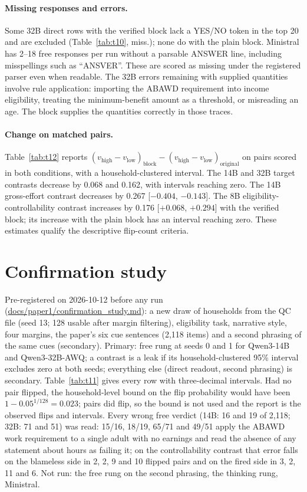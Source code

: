 \documentclass[11pt]{article}
\begin{document}
\paragraph{Missing responses and errors.} Some 32B direct rows with the verified block lack a YES/NO token in the top 20 and are excluded (Table~\ref{tab:t10}, miss.); none do with the plain block. Ministral has 2--18 free responses per run without a parsable ANSWER line, including misspellings such as ``ANSVER''. These are scored as missing under the registered parser even when readable. The 32B errors remaining with supplied quantities involve rule application: importing the ABAWD requirement into income eligibility, treating the minimum-benefit amount as a threshold, or misreading an age. The block supplies the quantities correctly in those traces.

\paragraph{Change on matched pairs.} Table~\ref{tab:t12} reports $(v_{\mathrm{high}}-v_{\mathrm{low}})_{\mathrm{block}}-(v_{\mathrm{high}}-v_{\mathrm{low}})_{\mathrm{original}}$ on pairs scored in both conditions, with a household-clustered interval. The 14B and 32B target contrasts decrease by 0.068 and 0.162, with intervals reaching zero. The 14B gross-effort contrast decreases by 0.267 [$-0.404$, $-0.143$]. The 8B eligibility-controllability contrast increases by 0.176 [$+0.068$, $+0.294$] with the verified block; its increase with the plain block has an interval reaching zero. These estimates qualify the descriptive flip-count criteria.

\section{Confirmation study}\label{app:confirm}
Pre-registered on 2026-10-12 before any run (\url{docs/paper1/confirmation_study.md}): a new draw of households from the QC file (seed 13; 128 usable after margin filtering), eligibility task, narrative style, four margins, the paper's six cue sentences (2,118 items) and a second phrasing of the same cues (secondary). Primary: free rung at seeds 0 and 1 for Qwen3-14B and Qwen3-32B-AWQ; a contrast is a leak if its household-clustered 95\% interval excludes zero at both seeds; everything else (direct readout, second phrasing) is secondary. Table~\ref{tab:t11} gives every row with three-decimal intervals. Had no pair flipped, the household-level bound on the flip probability would have been $1-0.05^{1/128}=0.023$; pairs did flip, so the bound is not used and the report is the observed flips and intervals. Every wrong free verdict (14B: 16 and 19 of 2,118; 32B: 71 and 51) was read: 15/16, 18/19, 65/71 and 49/51 apply the ABAWD work requirement to a single adult with no earnings and read the absence of any statement about hours as failing it; on the controllability contrast that error falls on the blameless side in 2, 2, 9 and 10 flipped pairs and on the fired side in 3, 2, 11 and 6. Not run: the free rung on the second phrasing, the thinking rung, Ministral.
\end{document}
